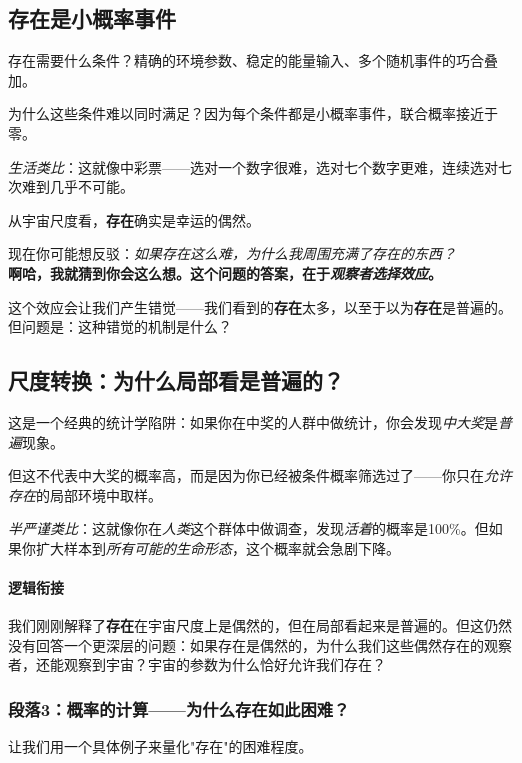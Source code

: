 \documentclass[../main.tex]{subfiles}
\begin{document}
	\subsection{存在是小概率事件}

	存在需要什么条件？精确的环境参数、稳定的能量输入、多个随机事件的巧合叠加。

	为什么这些条件难以同时满足？因为每个条件都是小概率事件，联合概率接近于零。

	\textit{生活类比}：这就像中彩票——选对一个数字很难，选对七个数字更难，连续选对七次难到几乎不可能。

	从宇宙尺度看，\textbf{存在}确实是幸运的偶然。

	\begin{tcolorbox}[colback=yellow!5, title=\textit{读者行为预测}]
		现在你可能想反驳：\textit{如果存在这么难，为什么我周围充满了存在的东西？}\\
		\textbf{啊哈，我就猜到你会这么想。这个问题的答案，在于\textit{观察者选择效应}。}
	\end{tcolorbox}

	这个效应会让我们产生错觉——我们看到的\textbf{存在}太多，以至于以为\textbf{存在}是普遍的。但问题是：这种错觉的机制是什么？

	\subsection{尺度转换：为什么局部看是普遍的？}

	这是一个经典的统计学陷阱：如果你在中奖的人群中做统计，你会发现\textit{中大奖}是\textit{普遍}现象。

	但这不代表中大奖的概率高，而是因为你已经被条件概率筛选过了——你只在\textit{允许存在}的局部环境中取样。

	\textit{半严谨类比}：这就像你在\textit{人类}这个群体中做调查，发现\textit{活着}的概率是100\%。但如果你扩大样本到\textit{所有可能的生命形态}，这个概率就会急剧下降。

	\paragraph*{逻辑衔接}
	我们刚刚解释了\textbf{存在}在宇宙尺度上是偶然的，但在局部看起来是普遍的。但这仍然没有回答一个更深层的问题：如果存在是偶然的，为什么我们这些偶然存在的观察者，还能观察到宇宙？宇宙的参数为什么恰好允许我们存在？

	\subsubsection*{段落3：概率的计算——为什么存在如此困难？}
	让我们用一个具体例子来量化"存在"的困难程度。
\end{document}
